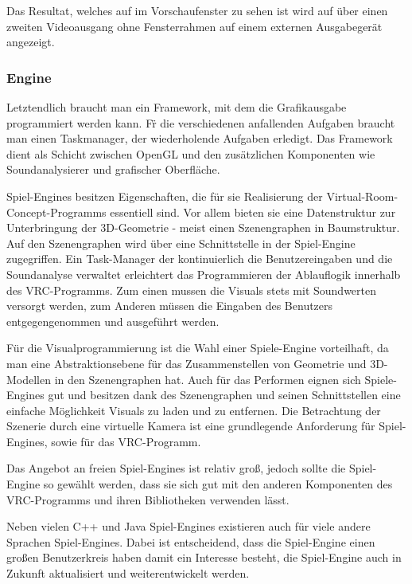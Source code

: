 Das Resultat, welches auf im Vorschaufenster zu sehen ist wird auf \"uber einen zweiten Videoausgang ohne Fensterrahmen auf
einem externen Ausgabeger\"at angezeigt.


\subsubsection{Engine}

Letztendlich braucht man ein Framework, mit dem die Grafikausgabe programmiert werden kann. F\"r die verschiedenen anfallenden
Aufgaben braucht man einen Taskmanager, der wiederholende Aufgaben erledigt. Das Framework dient als Schicht zwischen OpenGL
und den zus\"atzlichen Komponenten wie Soundanalysierer und grafischer Oberfl\"ache.

Spiel-Engines besitzen Eigenschaften, die f\"ur sie Realisierung der Virtual-Room-Concept-Programms essentiell sind. Vor
allem bieten sie eine Datenstruktur zur Unterbringung der 3D-Geometrie - meist einen Szenengraphen in Baumstruktur.
Auf den Szenengraphen wird \"uber eine Schnittstelle in der Spiel-Engine zugegriffen. Ein Task-Manager der kontinuierlich
die Benutzereingaben und die Soundanalyse verwaltet erleichtert das Programmieren der Ablauflogik innerhalb des VRC-Programms.
Zum einen mussen die Visuals stets mit Soundwerten versorgt werden, zum Anderen m\"ussen die Eingaben des Benutzers
entgegengenommen und ausgef\"uhrt werden.

F\"ur die Visualprogrammierung ist die Wahl einer Spiele-Engine vorteilhaft, da man eine Abstraktionsebene f\"ur das
Zusammenstellen von Geometrie und 3D-Modellen in den Szenengraphen hat.
Auch f\"ur das Performen eignen sich Spiele-Engines gut und besitzen dank des
Szenengraphen und seinen Schnittstellen eine einfache M\"oglichkeit Visuals zu laden und zu entfernen. Die Betrachtung
der Szenerie durch eine virtuelle Kamera ist eine grundlegende Anforderung f\"ur Spiel-Engines, sowie f\"ur das
VRC-Programm.

Das Angebot an freien Spiel-Engines ist relativ gro\ss{}, jedoch sollte die Spiel-Engine so gew\"ahlt werden, dass sie
sich gut mit den anderen  Komponenten des VRC-Programms und ihren Bibliotheken verwenden l\"asst.

Neben vielen C++ und Java Spiel-Engines existieren auch f\"ur viele andere Sprachen Spiel-Engines. Dabei ist entscheidend,
dass die Spiel-Engine einen gro\ss{}en Benutzerkreis haben damit ein Interesse besteht, die Spiel-Engine auch in Zukunft
aktualisiert und weiterentwickelt werden.

